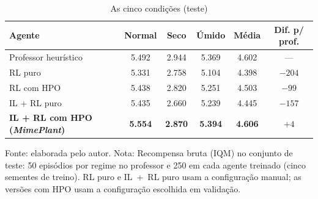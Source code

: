 \begin{table}[htbp]
\centering
\small\setlength{\tabcolsep}{2.5pt}
\caption{As cinco condições (teste)}
\label{tab:cinco_condicoes}
\begin{tabular}{l c c c c c}
\hline
\textbf{Agente} & \textbf{Normal} & \textbf{Seco} & \textbf{Úmido} & \textbf{Média} & \textbf{Dif. p/ prof.} \\ \hline
Professor heurístico & 5.492 & 2.944 & 5.369 & 4.602 & --- \\ \hline
RL puro & 5.331 & 2.758 & 5.104 & 4.398 & $-204$ \\
RL com HPO & 5.438 & 2.820 & 5.251 & 4.503 & $-99$ \\
IL + RL puro & 5.435 & 2.660 & 5.239 & 4.445 & $-157$ \\
\textbf{IL + RL com HPO (\textit{MimePlant})} & \textbf{5.554} & \textbf{2.870} & \textbf{5.394} & \textbf{4.606} & $+4$ \\
\hline
\end{tabular}

{\footnotesize Fonte: elaborada pelo autor. Nota: Recompensa bruta (IQM) no conjunto de teste: 50 episódios por regime no professor e 250 em cada agente treinado (cinco sementes de treino). RL puro e IL~+~RL puro usam a configuração manual; as versões com HPO usam a configuração escolhida em validação.}
\end{table}
